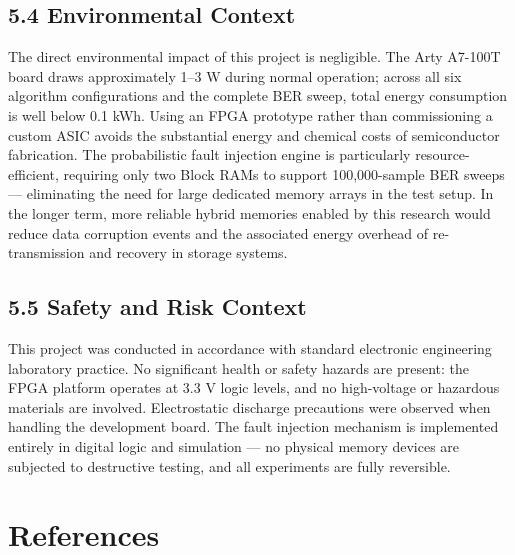 \subsection{5.4 Environmental Context}\label{environmental-context}

The direct environmental impact of this project is negligible. The Arty
A7-100T board draws approximately 1--3 W during normal operation; across
all six algorithm configurations and the complete BER sweep, total
energy consumption is well below 0.1 kWh. Using an FPGA prototype rather
than commissioning a custom ASIC avoids the substantial energy and
chemical costs of semiconductor fabrication. The probabilistic fault
injection engine is particularly resource-efficient, requiring only two
Block RAMs to support 100,000-sample BER sweeps --- eliminating the need
for large dedicated memory arrays in the test setup. In the longer term,
more reliable hybrid memories enabled by this research would reduce data
corruption events and the associated energy overhead of re-transmission
and recovery in storage systems.

\subsection{5.5 Safety and Risk Context}\label{safety-and-risk-context}

This project was conducted in accordance with standard electronic
engineering laboratory practice. No significant health or safety hazards
are present: the FPGA platform operates at 3.3 V logic levels, and no
high-voltage or hazardous materials are involved. Electrostatic
discharge precautions were observed when handling the development board.
The fault injection mechanism is implemented entirely in digital logic
and simulation --- no physical memory devices are subjected to
destructive testing, and all experiments are fully reversible.

\section{References}\label{references}


